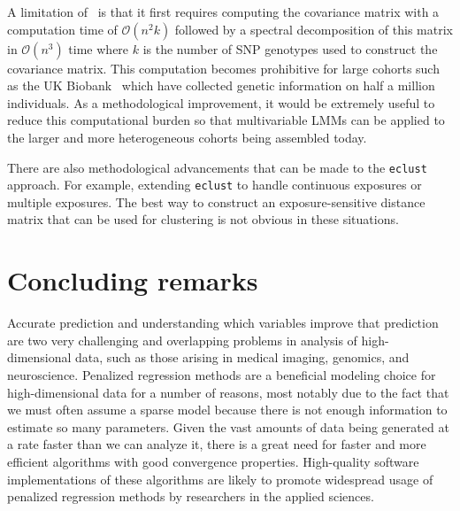 A limitation of \ggmix ~is that it first requires computing the covariance matrix with a computation time of $\mathcal{O}(n^2k)$ followed by a spectral decomposition of this matrix in $\mathcal{O}(n^3)$ time where $k$ is the number of SNP genotypes used to construct the covariance matrix. This computation becomes prohibitive for large cohorts such as the UK Biobank~\citep{allen2012uk} which have collected genetic information on half a million individuals. As a methodological improvement, it would be extremely useful to reduce this computational burden so that multivariable LMMs can be applied to the larger and more heterogeneous cohorts being assembled today.  

There are also methodological advancements that can be made to the \texttt{eclust} approach. For example, extending \texttt{eclust} to handle continuous exposures or multiple exposures. The best way to construct an exposure-sensitive distance matrix that can be used for clustering is not obvious in these situations. 

\section{Concluding remarks}

Accurate prediction and understanding which variables improve that prediction are two very challenging and overlapping problems in analysis of high-dimensional data, such as those arising in medical imaging, genomics, and neuroscience. Penalized regression methods are a beneficial modeling choice for high-dimensional data for a number of reasons, most notably due to the fact that we must often assume a sparse model because there is not enough information to estimate so many parameters. Given the vast amounts of data being generated at a rate faster than we can analyze it, there is a great need for faster and more efficient algorithms with good convergence properties. High-quality software implementations of these algorithms are likely to promote widespread usage of penalized regression methods by researchers in the applied sciences. 
